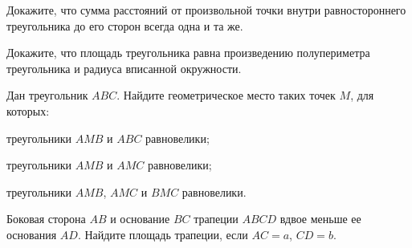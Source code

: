 \begin{tasks}
        \moditem{*} Докажите, что сумма расстояний от произвольной точки внутри равностороннего треугольника до его сторон всегда одна и та же.
    \item Докажите, что площадь треугольника равна произведению полупериметра треугольника и радиуса вписанной окружности.
    \item Дан треугольник $ABC$. Найдите геометрическое место таких точек $M$, для которых:
        \begin{tasks}
        \item треугольники $AMB$ и $ABC$ равновелики;
        \item треугольники $AMB$ и $AMC$ равновелики;
        \item треугольники $AMB$, $AMC$ и $BMC$ равновелики.
        \end{tasks}
    \item Боковая сторона $AB$ и основание $BC$ трапеции $ABCD$ вдвое меньше ее основания $AD$. Найдите площадь трапеции, если $AC = a$, $CD = b$.

\end{tasks}
